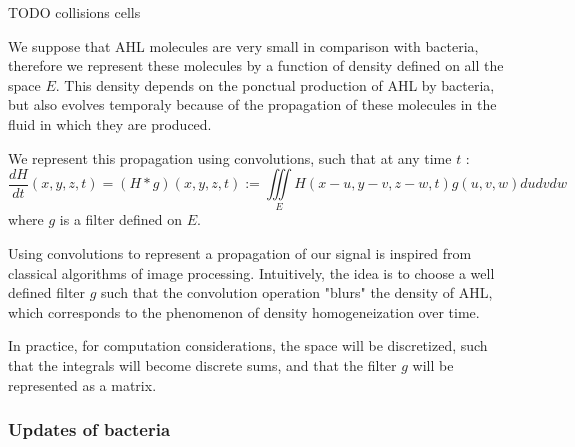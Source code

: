\documentclass[a4paper]{article}
\theoremstyle{definition}
\begin{document}
TODO collisions cells

We suppose that AHL molecules are very small in comparison with bacteria, therefore we represent these molecules by a function of density defined on all the space $E$. This density depends on the ponctual production of AHL by bacteria, but also evolves temporaly because of the propagation of these molecules in the fluid in which they are produced.

We represent this propagation using convolutions, such that at any time $t$ :
\begin{equation}
\frac{dH}{dt}(x,y,z,t) = (H * g)(x,y,z,t) := \iiint \limits_E H(x-u,y-v,z-w,t)g(u,v,w) du dv dw
\end{equation}
where $g$ is a filter defined on $E$.

Using convolutions to represent a propagation of our signal is inspired from classical algorithms of image processing. Intuitively, the idea is to choose a well defined filter $g$ such that the convolution operation "blurs" the density of AHL, which corresponds to the phenomenon of density homogeneization over time.


In practice, for computation considerations, the space will be discretized, such that the integrals will become discrete sums, and that the filter $g$ will be represented as a matrix.



\subsubsection{Updates of bacteria}
\end{document}
